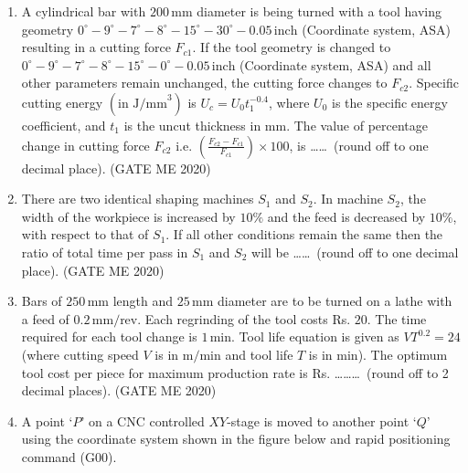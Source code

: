\documentclass[journal]{IEEEtran}
\begin{document}
\begin{enumerate}
    
\item A cylindrical bar with $200 \, \text{mm}$ diameter is being turned with a tool having geometry $0^\circ - 9^\circ - 7^\circ - 8^\circ - 15^\circ - 30^\circ - 0.05 \, \text{inch}$ (Coordinate system, ASA) resulting in a cutting force $F_{c1}$. If the tool geometry is changed to $0^\circ - 9^\circ - 7^\circ - 8^\circ - 15^\circ - 0^\circ - 0.05 \, \text{inch}$ (Coordinate system, ASA) and all other parameters remain unchanged, the cutting force changes to $F_{c2}$. Specific cutting energy $(\text{in J/mm}^3)$ is $U_c = U_0 t_1^{-0.4}$, where $U_0$ is the specific energy coefficient, and $t_1$ is the uncut thickness in mm. The value of percentage change in cutting force $F_{c2}$ i.e. $\left( \frac{F_{c2} - F_{c1}}{F_{c1}} \right) \times 100$, is \ldots\ldots \ (round off to one decimal place). \hfill (GATE ME 2020)

\item There are two identical shaping machines $S_1$ and $S_2$. In machine $S_2$, the width of the workpiece is increased by $10\%$ and the feed is decreased by $10\%$, with respect to that of $S_1$. If all other conditions remain the same then the ratio of total time per pass in $S_1$ and $S_2$ will be \ldots\ldots \ (round off to one decimal place). \hfill (GATE ME 2020)

\item
Bars of $250 \, \text{mm}$ length and $25 \, \text{mm}$ diameter are to be turned on a lathe with a feed of $0.2 \, \text{mm/rev}$. Each regrinding of the tool costs Rs. $20$. The time required for each tool change is $1 \, \text{min}$. Tool life equation is given as $VT^{0.2} = 24$ (where cutting speed $V$ is in $\text{m/min}$ and tool life $T$ is in $\text{min}$). The optimum tool cost per piece for maximum production rate is Rs. \ldots\ldots\ldots \ (round off to 2 decimal places). \hfill (GATE ME 2020)

\item
A point `$P$' on a CNC controlled $XY$-stage is moved to another point `$Q$' using the coordinate system shown in the figure below and rapid positioning command (G00).

\begin{center}
\end{center}
\end{enumerate}
\end{document}
